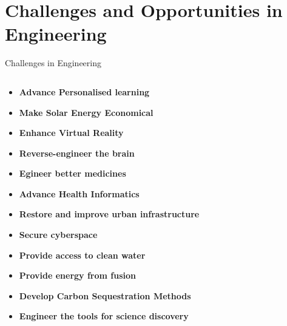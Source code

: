 
\section{Challenges and Opportunities in Engineering}

\begin{frame}{Challenges in Engineering}

  \begin{columns}
    \begin{column}{.7\linewidth}

  \begin{itemize}
    \item \textbf{Advance Personalised learning}
    \item \textbf{Make Solar Energy Economical}
    \item \textbf{Enhance Virtual Reality}
    \item \textbf{Reverse-engineer the brain}
    \item \textbf{Egineer better medicines}
    \item \textbf{Advance Health Informatics}
    \item \textbf{Restore and improve urban infrastructure}
    \item \textbf{Secure cyberspace}
    \item \textbf{Provide access to clean water}
    \item \textbf{Provide energy from fusion}
    \item \textbf{Develop Carbon Sequestration Methods}
    \item \textbf{Engineer the tools for science discovery}
  \end{itemize}

    \end{column}



  \begin{column}{.3\linewidth}


\end{column}
\end{columns}
\end{frame}
